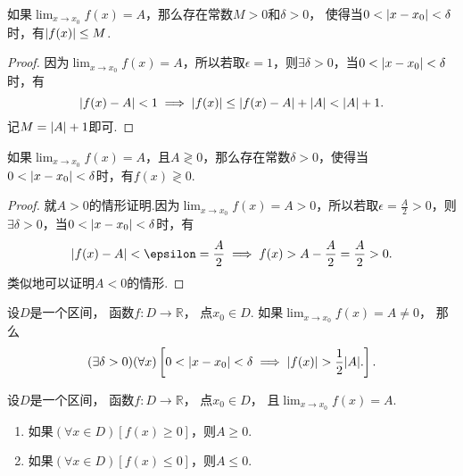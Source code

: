 \begin{theorem}[函数极限的局部有界性]\label{theorem:极限.函数极限的局部有界性}
如果\(\lim_{x \to x_0}f(x) = A\)，那么存在常数\(M>0\)和\(\delta>0\)，
使得当\(0<\abs{x-x_0}<\delta\)时，有\(\abs{f(x)} \leq M\).
\begin{proof}
因为\(\lim_{x \to x_0}f(x) = A\)，所以若取\(\epsilon = 1\)，则\(\exists \delta > 0\)，当\(0 < \abs{x - x_0} < \delta\)时，有\[
\abs{f(x) - A} < 1 \implies \abs{f(x)} \leq \abs{f(x) - A} + \abs{A} < \abs{A} + 1.
\]记\(M = \abs{A} + 1\)即可.
\end{proof}
\end{theorem}

\begin{theorem}[函数极限的局部保号性]\label{theorem:极限.函数极限的局部保号性1}
如果\(\lim_{x \to x_0}f(x)=A\)，且\(A \gtrless 0\)，那么存在常数\(\delta>0\)，使得当\(0<\abs{x-x_0}<\delta\)时，有\(f(x) \gtrless 0\).
\begin{proof}
就\(A > 0\)的情形证明.因为\(\lim_{x \to x_0}f(x) = A > 0\)，所以若取\(\epsilon = \frac{A}{2} > 0\)，则\(\exists \delta > 0\)，当\(0 < \abs{x - x_0} < \delta\)时，有\[
\abs{f(x) - A} < \epsilon = \frac{A}{2}
\implies f(x) > A - \frac{A}{2} = \frac{A}{2} > 0.
\]类似地可以证明\(A < 0\)的情形.
\end{proof}
\end{theorem}

\begin{theorem}\label{theorem:极限.函数极限的局部保号性2}
设\(D\)是一个区间，
函数\(f\colon D\to\mathbb{R}\)，
点\(x_0 \in D\).
如果\(\lim_{x \to x_0} f(x) = A \neq 0\)，
那么\[
	(\exists \delta>0)
	(\forall x)
	\left[
		0<\abs{x-x_0}<\delta
		\implies
		\abs{f(x)}>\frac12\abs{A}.
	\right].
\]
\end{theorem}

\begin{corollary}\label{theorem:极限.函数极限的局部保号性3}
设\(D\)是一个区间，
函数\(f\colon D\to\mathbb{R}\)，
点\(x_0 \in D\)，
且\(\lim_{x \to x_0} f(x) = A\).
\begin{enumerate}
	\item 如果\((\forall x \in D)[f(x) \geq 0]\)，则\(A \geq 0\).
	\item 如果\((\forall x \in D)[f(x) \leq 0]\)，则\(A \leq 0\).
\end{enumerate}
\end{corollary}


